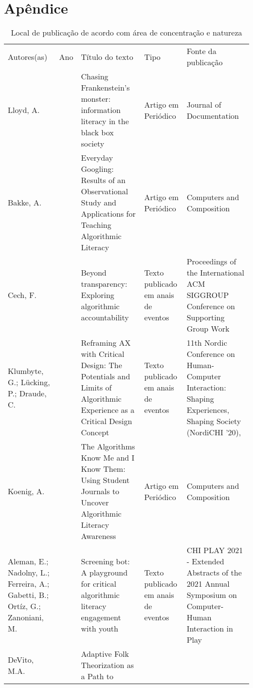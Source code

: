 \section*{Apêndice}\label{anexo-1}

\setlength\LTleft{-0.8in}
\setlength\LTright{-0.8in}
\begin{footnotesize}
\begin{longtable}{
    >{\raggedright\arraybackslash}p{}
    >{\raggedright\arraybackslash}p{}
    >{\raggedright\arraybackslash}p{}
    >{\raggedright\arraybackslash}p{}
    >{\raggedright\arraybackslash}p{}
    }
\caption{Local de publicação de acordo com área de concentração e natureza} \label{tab-anexo-1}\\
\\
\toprule
Autores(as) & Ano & Título do texto &Tipo &Fonte da publicação\\
\midrule
Lloyd, A. & 2019 & Chasing Frankenstein's monster: information literacy
in the black box society & Artigo em Periódico & Journal of
Documentation \\
Bakke, A. & 2020 & Everyday Googling: Results of an Observational Study
and Applications for Teaching Algorithmic Literacy & Artigo em Periódico
& Computers and Composition \\
Cech, F. & 2020 & Beyond transparency: Exploring algorithmic
accountability & Texto publicado em anais de eventos & Proceedings of
the International ACM SIGGROUP Conference on Supporting Group Work \\
Klumbyte, G.; Lücking, P.; Draude, C. & 2020 & Reframing AX with
Critical Design: The Potentials and Limits of Algorithmic Experience as
a Critical Design Concept & Texto publicado em anais de eventos & 11th
Nordic Conference on Human-Computer Interaction: Shaping Experiences,
Shaping Society (NordiCHI '20), \\
Koenig, A. & 2020 & The Algorithms Know Me and I Know Them: Using
Student Journals to Uncover Algorithmic Literacy Awareness & Artigo em
Periódico & Computers and Composition \\
Aleman, E.; Nadolny, L.; Ferreira, A.; Gabetti, B.; Ortíz, G.;
Zanoniani, M. & 2021 & Screening bot: A playground for critical
algorithmic literacy engagement with youth & Texto publicado em anais de
eventos & CHI PLAY 2021 - Extended Abstracts of the 2021 Annual
Symposium on Computer-Human Interaction in Play \\
DeVito, M.A. & 2021 & Adaptive Folk Theorization as a Path to

\end{longtable}
\end{footnotesize}
